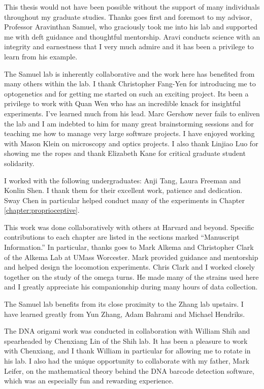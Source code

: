 
This thesis would not have been possible without the support of many individuals throughout my graduate studies. Thanks goes first and foremost to my advisor, Professor Aravinthan Samuel, who graciously took me into his lab and supported me with deft  guidance and thoughtful mentorship. Aravi conducts science with an integrity and earnestness that I very much admire and it has been a privilege to learn from his example.


The Samuel lab is inherently collaborative and the work here has benefited from many others within the lab. I  thank Christopher Fang-Yen for introducing me to optogenetics and for getting me started on such an exciting project. Its been a privilege to work with Quan Wen who has an incredible knack for insightful experiments. I've learned much from his lead. Marc Gershow never fails to enliven the lab and I am indebted to him for many great brainstorming sessions and for teaching me how to manage very large software projects. I have enjoyed working with Mason Klein on microscopy and optics projects.  I also thank Linjiao Luo for showing me the ropes and thank Elizabeth Kane for critical graduate student solidarity.

I worked with the following undergraduates: Anji Tang, Laura Freeman and Konlin Shen. I thank them for their excellent work, patience and dedication. Sway Chen in particular helped conduct many of the experiments in Chapter \ref{chapter:proprioceptive}.

This work was done collaboratively with others at Harvard and beyond. Specific contributions to each chapter are listed in the sections marked ``Manuscript Information.'' In particular, thanks goes to Mark Alkema and Christopher Clark of the Alkema Lab at UMass Worcester. Mark provided guidance and mentorship and helped design the locomotion experiments. Chris Clark and I worked closely together on the study of the omega turns. He made many of the strains used here and I greatly appreciate his companionship during many hours of data collection.

The Samuel lab benefits from its close proximity to the Zhang lab upstairs. I have learned greatly from Yun Zhang, Adam Bahrami and Michael Hendriks.

The DNA origami work was conducted in collaboration with William Shih and spearheaded by Chenxiang Lin of the Shih lab.  It has been a pleasure to work with Chenxiang, and I thank William in particular for allowing me to rotate in his lab. I also had the unique opportunity to collaborate with my father, Mark Leifer, on the mathematical theory behind the DNA barcode detection software, which was an especially fun and rewarding experience.

